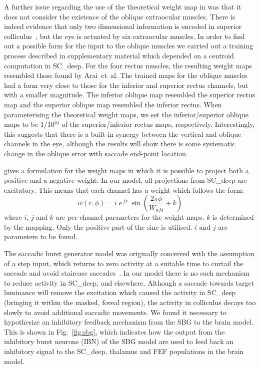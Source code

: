 \documentclass{frontiersSCNS}
\begin{document}
A further issue regarding the use of the theoretical weight map
in \cite{tabareau_geometry_2007} was that it does not consider the 
existence of the oblique extraocular muscles. There is indeed evidence that
only two dimensional information is encoded in superior
colliculus~\cite{wurtz_activity_1972,van_opstal_two-rather_1991}, but the
eye is actuated by six extraocular muscles. In order to find out a 
possible form for the input to the oblique muscles we carried out a 
training process described in supplementary material which depended on a
centroid computation in SC\_deep. For the four rectus muscles, the 
resulting weight maps resembled those found by Arai~et~al. The trained 
maps for the oblique muscles had a form very close to those for the 
inferior and superior rectus channels, but with a smaller magnitude.
The inferior oblique map resembled the superior rectus map and the 
superior oblique map resembled the inferior rectus. When parameterising 
the theoretical weight maps, we set the inferior/superior 
oblique maps to be 1/10$^{\mathrm{th}}$ of the superior/inferior rectus
maps, respectively. Interestingly, this suggests that there is a built-in
synergy between the vertical and oblique channels in the eye, although
the results will show there is some systematic change in the oblique error
with saccade end-point location.

\cite{tabareau_geometry_2007} gives a formulation for the weight maps
in which it is possible to project both a positive and a negative 
weight. In our model, all projections from SC\_deep are excitatory. 
This means that each channel has a weight which follows the form:
\begin{equation} \label{eq:weightmaps}
w(r,\phi) = i\;e\,^{jr}\;\sin\left(\frac{2\pi\phi}{W_{nfs}} + k\right)
\end{equation}
where $i$, $j$ and $k$ are per-channel parameters for the weight
maps. $k$ is determined by the mapping. Only the positive part of the
sine is utilised. $i$ and $j$ are parameters to be found.

The saccadic burst generator model was originally conceived with the
assumption of a step input, which returns to zero activity at a suitable
time to curtail the saccade and avoid staircase
saccades~\cite{gancarz_neural_1998}. In our model 
there is no such mechanism to reduce activity in SC\_deep, and elsewhere. 
Although a saccade towards target luminance will remove the excitation 
which caused the activity in SC\_deep (bringing it within the masked, 
foveal region), the activity in colliculus decays too slowly to avoid
additional saccadic movements. We found it necessary to hypothesize 
an inhibitory feedback mechanism from the SBG to the brain model. 
This is shown in Fig.~\ref{fig:sbg}, which indicates how the output from 
the inhibitory burst neurons  (IBN) of the SBG model are used to feed 
back an inhibitory signal to the SC\_deep, thalamus and FEF populations
in the brain model. 
\end{document}
